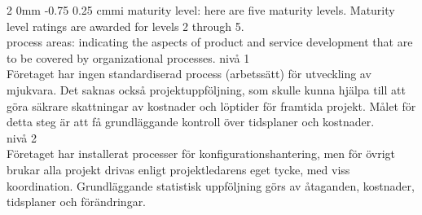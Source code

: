 \documentclass[a4paper,11pt]{article}
\makeatletter
\renewcommand{\subsection}{\@startsection
   {subsection}%
   {2}%
   {0mm}%
   {-0.75\baselineskip}%
   {0.25\baselineskip}%
   {\rmfamily\normalfont\slshape\normalsize}}%
\makeatother
\begin{document}
\subsection{cmmi}
maturity level:
here are five maturity levels. Maturity level ratings are awarded for levels 2 through 5.
\\process areas:
indicating the aspects of product and service development that are to be covered by organizational processes. 
nivå 1\\
Företaget har ingen standardiserad process (arbetssätt) för utveckling av mjukvara. Det saknas också projektuppföljning, som skulle kunna hjälpa till att göra säkrare skattningar av kostnader och löptider för framtida projekt. Målet för detta steg är att få grundläggande kontroll över tidsplaner och kostnader.
\\nivå 2
\\Företaget har installerat processer för konfigurationshantering, men för övrigt brukar alla projekt drivas enligt projektledarens eget tycke, med viss koordination. Grundläggande statistisk uppföljning görs av åtaganden, kostnader, tidsplaner och förändringar.
\end{document}
